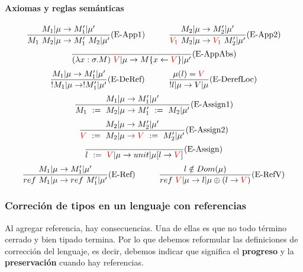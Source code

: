 \paragraph{Axiomas y reglas semánticas}
\begin{equation*}
\frac{M_1|\mu\to M'_1|\mu'}{M_1~M_2|\mu\to M'_1~M_2|\mu'}(\text{E-App1})\hspace*{1cm}\frac{M_2|\mu\to M'_2|\mu'}{\color{red}V_1\color{black}~M_2|\mu\to \color{red}V_1\color{black}~M'_2|\mu'}(\text{E-App2})
\end{equation*}
\vspace*{5mm}
\begin{equation*}
\frac{}{(\lambda x: \sigma . M)~\color{red}V\color{black}|\mu\to M\{x\leftarrow\color{red}V\color{black}\}|\mu'}(\text{E-AppAbs})
\end{equation*}
\vspace*{5mm}
\begin{equation*}
\frac{M_1|\mu\to M'_1|\mu'}{!M_1|\mu\to !M_1'|\mu'}(\text{E-DeRef})\hspace*{1cm}
\frac{\mu(l) = \color{red}V\color{black}}{!l|\mu\to V|\mu}(\text{E-DerefLoc})
\end{equation*}
\vspace*{5mm}
\begin{equation*}
\frac{M_1|\mu\to M'_1|\mu'}{M_1~:=~M_2|\mu\to M'_1~:=~M_2|\mu'}(\text{E-Assign1})
\end{equation*}
\vspace*{5mm}
\begin{equation*}
\frac{M_2|\mu\to M'_2|\mu'}{\color{red}V\color{black}~:=~M_2|\mu\to \color{red}V\color{black}~:=~M'_2|\mu'}(\text{E-Assign2})
\end{equation*}
\vspace*{5mm}
\begin{equation*}
\frac{}{l~:=~\color{red}V\color{black}|\mu\to unit|\mu[l\to \color{red}V\color{black}]}(\text{E-Assign})
\end{equation*}
\vspace*{5mm}
\begin{equation*}
\frac{M_1|\mu\to M'_1|\mu'}{ref~M_1|\mu\to ref~M'_1|\mu'}(\text{E-Ref})\hspace*{1cm}
\frac{l\notin Dom(\mu)}{ref~\color{red}V\color{black}|\mu\to l|\mu\oplus(l\to \color{red}V\color{black})}(\text{E-RefV})
\end{equation*}

\subsubsection{Correción de tipos en un lenguaje con referencias}
Al agregar referencia, hay consecuencias. Una de ellas es que no todo término cerrado y bien tipado termina. Por lo que debemos reformular las definiciones de corrección del lenguaje, es decir, debemos indicar que significa el \textbf{progreso} y la \textbf{preservación} cuando hay referencias.

